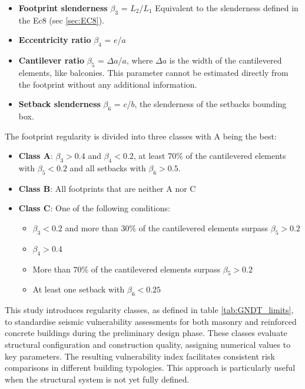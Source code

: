 \begin{refsection}
\begin{itemize}
    \item \textbf{Footprint slenderness} $\beta_3$ = $L_2$/$L_1$ Equivalent to the slenderness defined in the Ec8 (sec \ref{sec:EC8}).
    \item \textbf{Eccentricity ratio} $\beta_4$ = $e$/$a$
    \item \textbf{Cantilever ratio} $\beta_5$ = $\Delta a$/$a$, where $\Delta a$ is the width of the cantilevered elements, like balconies. This parameter cannot be estimated directly from the footprint without any additional information.
    \item \textbf{Setback slenderness} $\beta_6$ = $c$/$b$, the slenderness of the setbacks bounding box.
\end{itemize}

The footprint regularity is divided into three classes with A being the best: 

\begin{itemize}
    \item \textbf{Class A}: $\beta_3 > 0.4$ and $\beta_4 < 0.2$, at least $70\%$ of the cantilevered elements with $\beta_5 < 0.2$ and all setbacks with $\beta_6 > 0.5$.
    \item \textbf{Class B}: All footprints that are neither A nor C
    \item \textbf{Class C}: One of the following conditions: 
    \begin{itemize}
        \item $\beta_3 < 0.2$ and more than $30\%$ of the cantilevered elements surpass $\beta_5 > 0.2$
        \item $\beta_4 > 0.4$
        \item More than $70\%$ of the cantilevered elements surpass $\beta_5 > 0.2$
        \item At least one setback with $\beta_6 < 0.25$
    \end{itemize}
\end{itemize}

This study introduces regularity classes, as defined in table \ref{tab:GNDT_limits}, to standardise seismic vulnerability assessments for both masonry and reinforced concrete buildings during the preliminary design phase. These classes evaluate structural configuration and construction quality, assigning numerical values to key parameters. The resulting vulnerability index facilitates consistent risk comparisons in different building typologies. This approach is particularly useful when the structural system is not yet fully defined.



\end{refsection}
